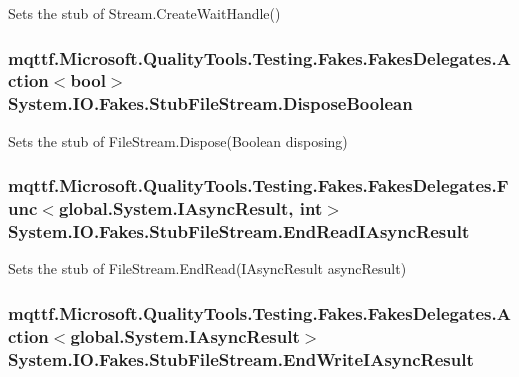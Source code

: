 Sets the stub of Stream.\-Create\-Wait\-Handle()

\hypertarget{class_system_1_1_i_o_1_1_fakes_1_1_stub_file_stream_aa214bd4276d6b786645aabc9203d3489}{
\subsubsection[{Dispose\-Boolean}]{\setlength{\rightskip}{0pt plus 5cm}mqttf.\-Microsoft.\-Quality\-Tools.\-Testing.\-Fakes.\-Fakes\-Delegates.\-Action$<$bool$>$ System.\-I\-O.\-Fakes.\-Stub\-File\-Stream.\-Dispose\-Boolean}}\label{class_system_1_1_i_o_1_1_fakes_1_1_stub_file_stream_aa214bd4276d6b786645aabc9203d3489}


Sets the stub of File\-Stream.\-Dispose(\-Boolean disposing)

\hypertarget{class_system_1_1_i_o_1_1_fakes_1_1_stub_file_stream_ab2b103204446d5f8da4c679e2c02fdbd}{
\subsubsection[{End\-Read\-I\-Async\-Result}]{\setlength{\rightskip}{0pt plus 5cm}mqttf.\-Microsoft.\-Quality\-Tools.\-Testing.\-Fakes.\-Fakes\-Delegates.\-Func$<$global.\-System.\-I\-Async\-Result, int$>$ System.\-I\-O.\-Fakes.\-Stub\-File\-Stream.\-End\-Read\-I\-Async\-Result}}\label{class_system_1_1_i_o_1_1_fakes_1_1_stub_file_stream_ab2b103204446d5f8da4c679e2c02fdbd}


Sets the stub of File\-Stream.\-End\-Read(\-I\-Async\-Result async\-Result)

\hypertarget{class_system_1_1_i_o_1_1_fakes_1_1_stub_file_stream_a2d8b598bee66754d861167d9a7779c1d}{
\subsubsection[{End\-Write\-I\-Async\-Result}]{\setlength{\rightskip}{0pt plus 5cm}mqttf.\-Microsoft.\-Quality\-Tools.\-Testing.\-Fakes.\-Fakes\-Delegates.\-Action$<$global.\-System.\-I\-Async\-Result$>$ System.\-I\-O.\-Fakes.\-Stub\-File\-Stream.\-End\-Write\-I\-Async\-Result}}\label{class_system_1_1_i_o_1_1_fakes_1_1_stub_file_stream_a2d8b598bee66754d861167d9a7779c1d}



